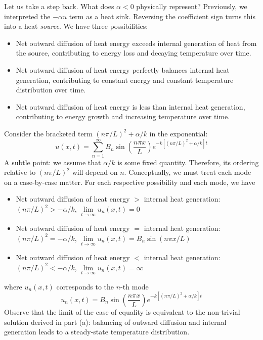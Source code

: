 \documentclass[a4paper]{article}
\begin{document}
\begin{enumerate}[label=(\alph*)]
	Let us take a step back. What does \( \alpha < 0 \) physically represent? Previously, we interpreted the \( -\alpha u \) term as a heat sink. Reversing the coefficient sign turns this into a heat \textit{source}. We have three possibilities:
	\begin{itemize}[label=\(\circ\)]
		\item Net outward diffusion of heat energy exceeds internal generation of heat from the source, contributing to energy loss and decaying temperature over time.
		\item Net outward diffusion of heat energy perfectly balances internal heat generation, contributing to constant energy and constant temperature distribution over time.
		\item Net outward diffusion of heat energy is less than internal heat generation, contributing to energy growth and increasing temperature over time.
	\end{itemize}
	Consider the bracketed term \( \!\left( n \pi / L \right)^{2} + \alpha / k \) in the exponential:
	\[
		u \!\left( x,t \right) = \sum^{\infty}_{n=1} B_{n}\sin\!\left(\frac{n \pi x}{L}\right)e^{-k \!\left[ \!\left( n \pi / L \right)^{2} + \alpha / k \right]t} 
	\]
	A subtle point: we assume that \( \alpha / k \) is some fixed quantity. Therefore, its ordering relative to \( \!\left( n \pi / L \right)^{2} \) will depend on \( n \). Conceptually, we must treat each mode on a case-by-case matter. For each respective possibility and each mode, we have
	\begin{itemize}[label=\(\circ\)]
		\item Net outward diffusion of heat energy \( > \) internal heat generation: \( \!\left( n \pi / L \right)^{2} > -\alpha / k \), \( \lim\limits_{t \to \infty} u_{n} \!\left( x,t \right) = 0 \)
		\item Net outward diffusion of heat energy \( = \) internal heat generation: \( \!\left( n \pi / L \right)^{2} = -\alpha / k \), \( \lim\limits_{t \to \infty} u_{n} \!\left( x,t \right) = B_{n}\sin\!\left(n \pi x / L\right) \)
		\item Net outward diffusion of heat energy \( < \) internal heat generation: \( \!\left( n \pi / L \right)^{2} < -\alpha / k \), \( \lim\limits_{t \to \infty} u_{n} \!\left( x,t \right) = \infty \)
	\end{itemize}
	where \( u_{n}\!\left( x,t \right) \) corresponds to the \( n \)-th mode
	\[
		u_{n} \!\left( x,t \right) = B_{n}\sin\!\left(\frac{n \pi x}{L}\right)e^{-k \!\left[ \!\left( n \pi / L \right)^{2} + \alpha / k \right]t} 
	\]
	Observe that the limit of the case of equality is equivalent to the non-trivial solution derived in part (a): balancing of outward diffusion and internal generation leads to a steady-state temperature distribution.


\end{enumerate}
\end{document}
